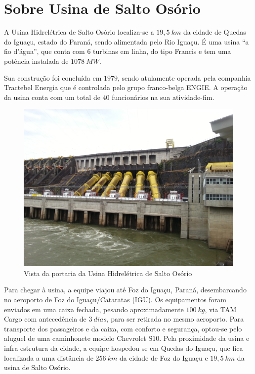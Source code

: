 \section{Sobre Usina de Salto Osório}

A Usina Hidrelétrica de Salto Osório localiza-se a $19,5~km$ da cidade de Quedas
do Iguaçu, estado do Paraná, sendo alimentada pelo Rio Iguaçu. É uma usina ``a
fio d'água'', que conta com $6$ turbinas em linha, do tipo Francis e tem uma potência
instalada de $1078~MW$.

Sua construção foi concluída em $1979$, sendo atulamente operada pela companhia
Tractebel Energia que é controlada pelo grupo franco-belga ENGIE. A operação da
usina conta com um total de $40$ funcionários na sua atividade-fim.


\begin{figure}[h!]
\centering
	\includegraphics[width=0.9\columnwidth]{figs/usina_01}
	\caption{Vista da portaria da Usina Hidrelétrica de Salto Osório}
	\label{fig::usina_01}
\end{figure}

Para chegar à usina, a equipe viajou até Foz do Iguaçu, Paraná, desembarcando no
aeroporto de Foz do Iguaçu/Cataratas (IGU). Os equipamentos foram enviados em
uma caixa fechada, pesando aproximadamente $100~kg$, via TAM Cargo com
antecedência de $3~dias$, para ser retirada no mesmo aeroporto. Para transporte
dos passageiros e da caixa, com conforto e segurança, optou-se pelo aluguel de
uma caminhonete modelo Chevrolet S$10$. Pela proximidade da usina e
infra-estrutura da cidade, a equipe hospedou-se em Quedas do Iguaçu,
que fica localizada a uma distância de $256~km$ da cidade de Foz do Iguaçu e
$19,5~km$ da usina de Salto Osório.

